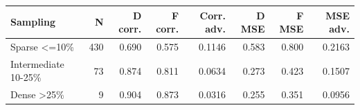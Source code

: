 \begin{tabular}{lrrrrrrr}
\toprule
Sampling & N & D corr. & F corr. & Corr. adv. & D MSE & F MSE & MSE adv. \\
\midrule
Sparse <=10\% & 430 & 0.690 & 0.575 & 0.1146 & 0.583 & 0.800 & 0.2163 \\
Intermediate 10-25\% & 73 & 0.874 & 0.811 & 0.0634 & 0.273 & 0.423 & 0.1507 \\
Dense >25\% & 9 & 0.904 & 0.873 & 0.0316 & 0.255 & 0.351 & 0.0956 \\
\bottomrule
\end{tabular}
